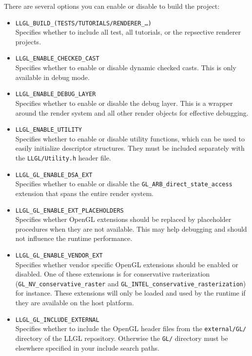 \documentclass{article}
\begin{document}
There are several options you can enable or disable to build the project:
\begin{itemize}
	\item \texttt{LLGL\_BUILD\_(TESTS/TUTORIALS/RENDERER\_\dots)} \\
	Specifies whether to include all test, all tutorials, or the repsective renderer projects.
	
	\item \texttt{LLGL\_ENABLE\_CHECKED\_CAST} \\
	Specifies whether to enable or disable dynamic checked casts.
	This is only available in debug mode.
	
	\item \texttt{LLGL\_ENABLE\_DEBUG\_LAYER} \\
	Specifies whether to enable or disable the debug layer.
	This is a wrapper around the render system and all other render objects for effective debugging.
	
	\item \texttt{LLGL\_ENABLE\_UTILITY} \\
	Specifies whether to enable or disable utility functions, which can be used to easily initialize descriptor structures.
	They must be included separately with the \texttt{LLGL/Utility.h} header file.
	
	\item \texttt{LLGL\_GL\_ENABLE\_DSA\_EXT} \\
	Specifies whether to enable or disable the \texttt{GL\_ARB\_direct\_state\_access} extension that spans the entire render system.
	
	\item \texttt{LLGL\_GL\_ENABLE\_EXT\_PLACEHOLDERS} \\
	Specifies whether OpenGL extensions should be replaced by placeholder procedures
	when they are not available. This may help debugging and should not influence the runtime performance.
	
	\item \texttt{LLGL\_GL\_ENABLE\_VENDOR\_EXT} \\
	Specifies whether vendor specific OpenGL extensions should be enabled or disabled.
	One of these extensions is for conservative rasterization
	(\texttt{GL\_NV\_conservative\_raster} and \texttt{GL\_INTEL\_conservative\_rasterization}) for instance.
	These extensions will only be loaded and used by the runtime if they are available on the host platform.
	
	\item \texttt{LLGL\_GL\_INCLUDE\_EXTERNAL} \\
	Specifies whether to include the OpenGL header files from the \texttt{external/GL/} directory of the LLGL repository.
	Otherwise the \texttt{GL/} directory must be elsewhere specified in your include search paths.
\end{itemize}
\end{document}
